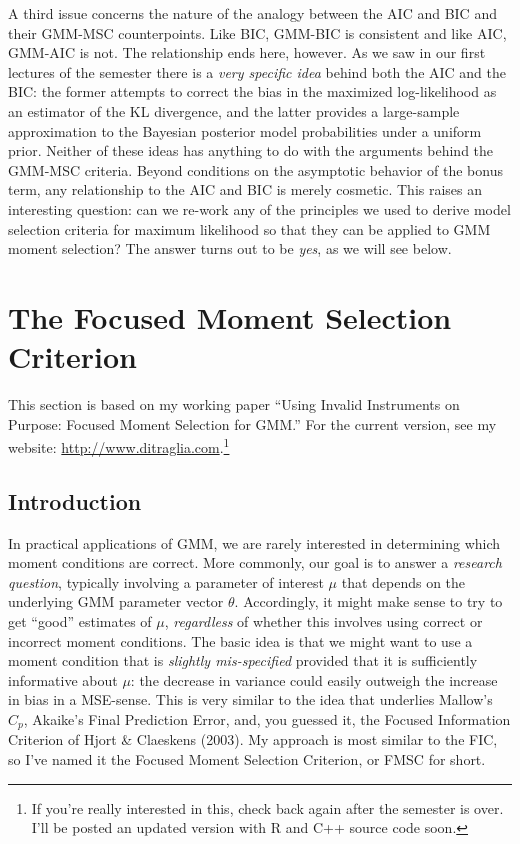 \documentclass[12pt]{article}
\theoremstyle{definition}
\begin{document}
A third issue concerns the nature of the analogy between the AIC and BIC and their GMM-MSC counterpoints. Like BIC, GMM-BIC is consistent and like AIC, GMM-AIC is not. The relationship ends here, however. As we saw in our first lectures of the semester there is a \emph{very specific idea} behind both the AIC and the BIC: the former attempts to correct the bias in the maximized log-likelihood as an estimator of the KL divergence, and the latter provides a large-sample approximation to the Bayesian posterior model probabilities under a uniform prior. Neither of these ideas has anything to do with the arguments behind the GMM-MSC criteria. Beyond conditions on the asymptotic behavior of the bonus term, any relationship to the AIC and BIC is merely cosmetic. This raises an interesting question: can we re-work any of the principles we used to derive model selection criteria for maximum likelihood so that they can be applied to GMM moment selection? The answer turns out to be \emph{yes}, as we will see below.



\section{The Focused Moment Selection Criterion}
This section is based on my working paper ``Using Invalid Instruments on Purpose: Focused Moment Selection for GMM.'' For the current version, see my website: \url{http://www.ditraglia.com}.\footnote{If you're really interested in this, check back again after the semester is over. I'll be posted an updated version with R and C++ source code soon.}

\subsection{Introduction}
In practical applications of GMM, we are rarely interested in determining which moment conditions are correct. More commonly, our goal is to answer a \emph{research question}, typically involving a parameter of interest $\mu$ that depends on the underlying GMM parameter vector $\theta$. Accordingly, it might make sense to try to get ``good'' estimates of $\mu$, \emph{regardless} of whether this involves using correct or incorrect moment conditions. The basic idea is that we might want to use a moment condition that is \emph{slightly mis-specified} provided that it is sufficiently informative about $\mu$: the decrease in variance could easily outweigh the increase in bias in a MSE-sense. This is very similar to the idea that underlies Mallow's $C_p$, Akaike's Final Prediction Error, and, you guessed it, the Focused Information Criterion of Hjort \& Claeskens (2003). My approach is most similar to the FIC, so I've named it the Focused Moment Selection Criterion, or FMSC for short. 
\end{document}
